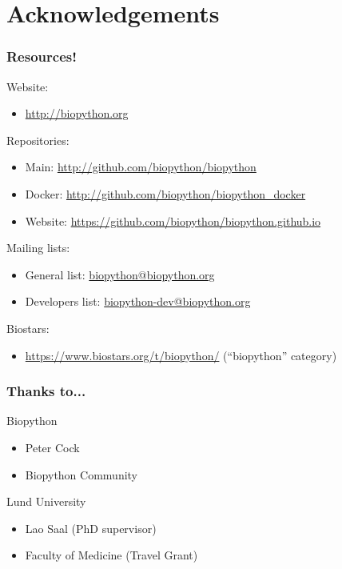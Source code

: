 \documentclass[trans]{beamer}
\begin{document}
\section*{Acknowledgements}
\frame
{
  \frametitle{Resources!}

  Website:\\
  \begin{itemize}
  \item \url{http://biopython.org}
  \end{itemize}

  Repositories:\\
  \begin{itemize}
  \item Main: \url{http://github.com/biopython/biopython}
  \item Docker: \url{http://github.com/biopython/biopython_docker}
  \item Website: \url{https://github.com/biopython/biopython.github.io}
  \end{itemize}

  Mailing lists:
  \begin{itemize}
  \item General list: \url{biopython@biopython.org}
  \item Developers list: \url{biopython-dev@biopython.org}
  \end{itemize}

  Biostars:
  \begin{itemize}
  \item \url{https://www.biostars.org/t/biopython/} (``biopython'' category)
  \end{itemize}
}

\frame
{
  \frametitle{Thanks to...}

  Biopython

  \begin{itemize}
  \item Peter Cock
  \item Biopython Community
  \end{itemize}

  Lund University

  \begin{itemize}
  \item Lao Saal (PhD supervisor)
  \item Faculty of Medicine (Travel Grant)
  \end{itemize}
}
\end{document}
